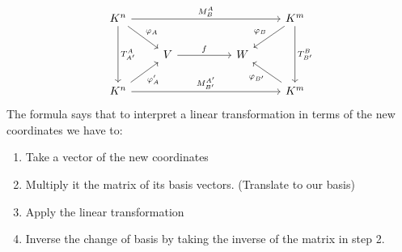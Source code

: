 \[
    \begin{tikzcd}
        K^n \arrow[dd, "T_{A'}^{A}"] \arrow[rrrr, "M_{B}^{A}"] \arrow[rd, "\varphi_A"] &                   &  &   & K^m \arrow[dd, "T_{B'}^{B}"] \arrow[ld, "\varphi_B"'] \\
                                                                                       & V \arrow[rr, "f"] &  & W &                                                       \\
        K^n \arrow[rrrr, "M_{B'}^{A'}"] \arrow[ru, "\varphi_{A}'"']                    &                   &  &   & K^m \arrow[lu, "\varphi_{B'}"]                       
    \end{tikzcd}
\]
The formula says that to interpret a linear transformation in terms of the
new coordinates we have to:
\begin{enumerate}
    \item Take a vector of the new coordinates
    \item Multiply it the matrix of its basis vectors. (Translate to our basis)
    \item Apply the linear transformation
    \item Inverse the change of basis by taking the inverse of the 
    matrix in step 2.
\end{enumerate}
